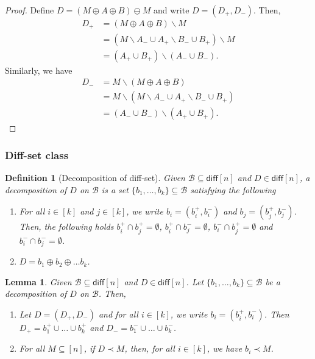 \documentclass{article}
\newtheorem{define}{Definition}
\newtheorem{lemma}{Lemma}
\newcommand{\diff}{\mathsf{diff}}
\newcommand{\diffvalid}{\prec}
\newcommand{\B}{\mathcal B}
\newcommand{\del}{\backslash}
\begin{document}
\begin{spacing}{1.1}
\begin{proof}
Define $D=(M\oplus A \oplus B)\ominus M$ and write $D=(D_+,D_-)$. Then,
\begin{align*}
D_+ &= (M\oplus A\oplus B) \del M\\ 
    &= (M\del A_-\cup A_+\del B_-\cup B_+) \del M\\
    &= (A_+\cup B_+)\del(A_-\cup B_-).
\end{align*}
Similarly, we have
\begin{align*}
D_- &= M\del (M\oplus A\oplus B)\\ 
    &= M\del (M\del A_-\cup A_+\del B_-\cup B_+)\\
    &= (A_-\cup B_-)\del (A_+\cup B_+).
\end{align*}
\end{proof}

\subsubsection{Diff-set class}

\begin{define}[Decomposition of diff-set]
Given $\B\subseteq \diff[n]$ and $D\in \diff[n]$, 
a decomposition of $D$ on $\B$ is a set $\{b_1,\ldots,b_k\} \subseteq \B$ satisfying the following
\begin{enumerate}
  \item For all $i\in[k]$ and $j\in [k]$, we write $b_i=(b_i^+,b_i^-)$ and $b_j=(b_j^+,b_j^-)$. Then, the following holds
  $b_i^+\cap b_j^+=\emptyset$, $b_i^+\cap b_j^-=\emptyset$, $b_i^-\cap b_j^+ =\emptyset$ and $b_i^-\cap b_j^-=\emptyset$.
  \item $D=b_1 \oplus b_2 \oplus \ldots b_k$.
\end{enumerate}
\end{define}

\begin{lemma}
Given $\B\subseteq \diff[n]$ and $D\in \diff[n]$.
Let $\{b_1,\ldots,b_k\} \subseteq \B$ be a decomposition of $D$ on $\B$.
Then,
\begin{enumerate}
\item Let $D=(D_+,D_-)$ and for all $i \in [k]$, we write $b_i = (b_i^+,b_i^-)$.
	  Then $D_+=b_1^+ \cup \ldots \cup b_k^+$ and $D_-=b_1^-\cup\ldots\cup b_k^-$.
\item For all $M\subseteq [n]$, if $D\diffvalid M$, then, for all $i\in [k]$, we have $b_i \diffvalid M$.
\end{enumerate}
\end{lemma}


\end{spacing}
\end{document}
